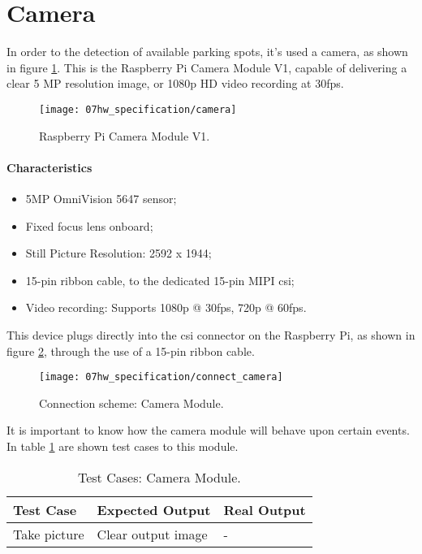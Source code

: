 \section{Camera}
In order to the detection of available parking spots, it's used a camera, as shown in figure \ref{fig:camera}. This is the Raspberry Pi Camera Module V1, capable of delivering a clear 5 MP resolution image, or 1080p HD video recording at 30fps. \cite{camera}

\begin{figure}[H]
	\centering
	\texttt{[image: 07hw\_specification/camera]}
	\caption{Raspberry Pi Camera Module V1.}
	\label{fig:camera}
\end{figure}

\paragraph*{Characteristics}
\begin{itemize}
	\item 5MP OmniVision 5647 sensor;
	\item Fixed focus lens onboard;
	\item Still Picture Resolution: 2592 x 1944;
	\item 15-pin ribbon cable, to the dedicated 15-pin MIPI \ac{csi};
	\item Video recording: Supports 1080p @ 30fps, 720p @ 60fps.
\end{itemize}

\clearpage
{}

This device plugs directly into the \ac{csi} connector on the Raspberry Pi, as shown in figure \ref{fig:connect_camera}, through the use of a 15-pin ribbon cable.

\begin{figure}[ht]
	\centering
	\texttt{[image: 07hw\_specification/connect\_camera]}
	\caption{Connection scheme: Camera Module.}
	\label{fig:connect_camera}
\end{figure}


It is important to know how the camera module will behave upon certain events. In table \ref{table:test_camera} are shown test cases to this module.

\begin{table}[H]
	\centering
	\resizebox{\columnwidth}{!}
	{
	\begin{tabular}{|m{3cm}|m{5cm}||m{5cm}|}
		\hline
		\textbf{Test Case} & \textbf{Expected Output} & \textbf{Real Output}
		\\\hline\hline
		Take picture & Clear output image & -
		\\\hline
	\end{tabular}
	}
	\caption{Test Cases: Camera Module.}
	\label{table:test_camera}
\end{table}


